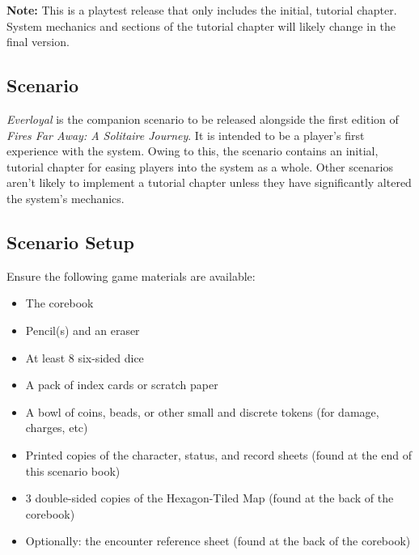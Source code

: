 \documentclass[12pt]{article}
\begin{document}
\vspace*{\fill}

\begin{center}
{\Large \textbf{Note:}
This is a playtest release that only includes the initial, tutorial chapter.\\
System mechanics and sections of the tutorial chapter will likely change in the final version.\\
}
\end{center}

\vspace*{\fill}

\pagebreak

\begin{multicols*}{2}


\section{Scenario}
\emph{Everloyal} is the companion scenario to be released alongside the first edition of \emph{Fires Far Away: A Solitaire Journey}. It is intended to be a player’s first experience with the system. Owing to this, the scenario contains an initial, tutorial chapter for easing players into the system as a whole. Other scenarios aren’t likely to implement a tutorial chapter unless they have significantly altered the system’s mechanics.

\subsection{Scenario Setup}
Ensure the following game materials are available:

\begin{itemize}
\item The corebook
\item Pencil(s) and an eraser
\item At least 8 six-sided dice
\item A pack of index cards or scratch paper
\item A bowl of coins, beads, or other small and discrete tokens (for damage, charges, etc)
\item Printed copies of the character, status, and record sheets (found at the end of this scenario book)
\item 3 double-sided copies of the Hexagon-Tiled Map (found at the back of the corebook)
\item Optionally: the encounter reference sheet (found at the back of the corebook)
\end{itemize}


\end{multicols*}
\end{document}
